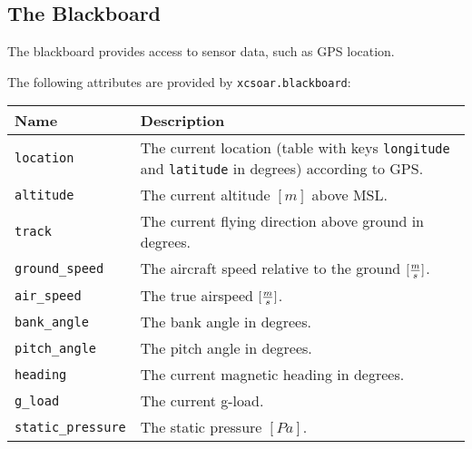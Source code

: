 \subsection{The Blackboard}

The blackboard provides access to sensor data, such as GPS location.

The following attributes are provided by \verb|xcsoar.blackboard|:

\begin{maxipage}
\begin{tabular}{l|p{12cm}}
Name & Description \\
\hline\hline

\verb|location| & The current location (table with
keys \verb|longitude| and \verb|latitude| in degrees) according to
GPS. \\

\hline

\verb|altitude| & The current altitude $[m]$ above MSL. \\

\hline

\verb|track| & The current flying direction above ground in degrees. \\

\hline

\verb|ground_speed| & The aircraft speed relative to the ground
$[{m \over s}]$. \\

\hline

\verb|air_speed| & The true airspeed
$[{m \over s}]$. \\

\hline

\verb|bank_angle| & The bank angle in degrees. \\

\hline

\verb|pitch_angle| & The pitch angle in degrees. \\

\hline

\verb|heading| & The current magnetic heading in degrees. \\

\hline

\verb|g_load| & The current g-load. \\

\hline

\verb|static_pressure| & The static pressure
$[{Pa}]$. \\

\hline


\end{tabular}
\end{maxipage}
